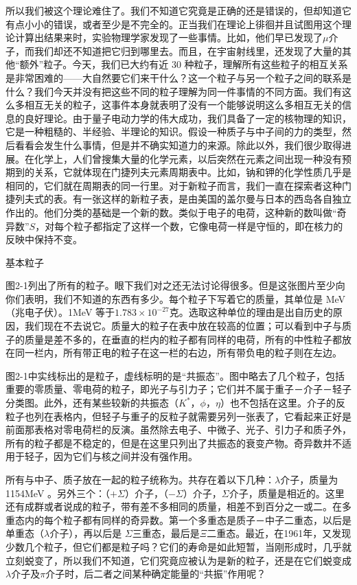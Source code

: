\documentclass[12pt,oneside]{book}
\begin{document}
所以我们被这个理论难住了。我们不知道它究竟是正确的还是错误的，但却知道它有点小小的错误，或者至少是不完全的。正当我们在理论上徘徊并且试图用这个理论计算出结果来时，实验物理学家发现了一些事情。比如，他们早已发现了$\mu$介子，而我们却还不知道把它归到哪里去。而且，在宇宙射线里，还发现了大量的其他“额外”粒子。今天，我们已大约有近 30 种粒子，理解所有这些粒子的相互关系是非常困难的——大自然要它们来干什么？这一个粒子与另一个粒子之间的联系是什么？我们今天并没有把这些不同的粒子理解为同一件事情的不同方面。我们有这么多相互无关的粒子，这事件本身就表明了没有一个能够说明这么多相互无关的信息的良好理论。由于量子电动力学的伟大成功，我们具备了一定的核物理的知识，它是一种粗糙的、半经验、半理论的知识。假设一种质子与中子间的力的类型，然后看看会发生什么事情，但是并不确实知道力的来源。除此以外，我们很少取得进展。在化学上，人们曾搜集大量的化学元素，以后突然在元素之间出现一种没有预期到的关系，它就体现在门捷列夫元素周期表中。比如，钠和钾的化学性质几乎是相同的，它们就在周期表的同一行里。对于新粒子而言，我们一直在探索者这种门捷列夫式的表。有一张这样的新粒子表，是由美国的盖尔曼与日本的西岛各自独立作出的。他们分类的基础是一个新的数。类似于电子的电荷，这种新的数叫做“奇异数”$S$，对每个粒子都指定了这样一个数，它像电荷一样是守恒的，即在核力的反映中保持不变。
\begin{linefig}{基本粒子}
\caption{基本粒子}
\label{fig:基本粒子}
\end{linefig}
图2-1列出了所有的粒子。眼下我们对之还无法讨论得很多。但是这张图片至少向你们表明，我们不知道的东西有多少。每个粒子下写着它的质量，其单位是 MeV（兆电子伏）。1MeV 等于$ 1.783\times10^{-27} $克。选取这种单位的理由是出自历史的原因，我们现在不去说它。质量大的粒子在表中放在较高的位置；可以看到中子与质子的质量是差不多的，在垂直的栏内的粒子都有同样的电荷，所有的中性粒子都放在同一栏内，所有带正电的粒子在这一栏的右边，所有带负电的粒子则在左边。

图2-1中实线标出的是粒子，虚线标明的是“共振态”。图中略去了几个粒子，包括重要的零质量、零电荷的粒子，即光子与引力子；它们并不属于重子－介子－轻子分类图。此外，还有某些较新的共振态（$K^*$，$\phi$，$\eta$）也不包括在这里。介子的反粒子也列在表格内，但轻子与重子的反粒子就需要另列一张表了，它看起来正好是前面那表格对零电荷栏的反演。虽然除去电子、中微子、光子、引力子和质子外，所有的粒子都是不稳定的，但是在这里只列出了共振态的衰变产物。奇异数并不适用于轻子，因为它们与核之间并没有强作用。

所有与中子、质子放在一起的粒子统称为。共存在着以下几种：$\lambda$介子，质量为 1154MeV 。另外三个：（$ +\Sigma $）介子，（$ -\Sigma $）介子，$ \Sigma $介子，质量是相近的。这里还有成群或者说成的粒子，带有差不多相同的质量，相差不到百分之一或二。在多重态内的每个粒子都有同样的奇异数。第一个多重态是质子－中子二重态，以后是单重态（$\lambda$介子），再以后是 $ \Sigma $三重态，最后是$ \Xi $二重态。最近，在1961年，又发现少数几个粒子，但它们都是粒子吗？它们的寿命是如此短暂，当刚形成时，几乎就立刻蜕变了，所以我们不知道，它们究竟应被认为是新的粒子，还是在它们蜕变成$\lambda$介子及$\pi$介子时，后二者之间某种确定能量的“共振”作用呢？
\end{document}
